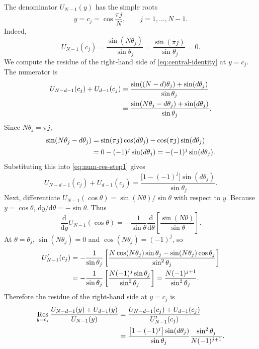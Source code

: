 \documentclass[11pt]{article}
\newcommand{\dd}{\mathrm{d}}
\DeclareMathOperator{\Res}{Res}
\begin{document}
The denominator $U_{N-1}(y)$ has the simple roots
\begin{equation}
  y=c_j=\cos\frac{\pi j}{N},
  \qquad j=1,\ldots,N-1.
\end{equation}
Indeed,
\begin{equation}
  U_{N-1}(c_j)=\frac{\sin(N\theta_j)}{\sin\theta_j}
  =\frac{\sin(\pi j)}{\sin\theta_j}=0.
\end{equation}
We compute the residue of the right-hand side of \eqref{eq:central-identity} at $y=c_j$.
The numerator is
\begin{align}
  U_{N-d-1}(c_j)+U_{d-1}(c_j)
  &=\frac{\sin((N-d)\theta_j)+\sin(d\theta_j)}{\sin\theta_j} \notag\\
  &=\frac{\sin(N\theta_j-d\theta_j)+\sin(d\theta_j)}{\sin\theta_j}.\label{eq:num-res-step1}
\end{align}
Since $N\theta_j=\pi j$,
\begin{align}
  \sin(N\theta_j-d\theta_j)
  &=\sin(\pi j)\cos(d\theta_j)-\cos(\pi j)\sin(d\theta_j)\notag\\
  &=0-(-1)^j\sin(d\theta_j)
  =-(-1)^j\sin(d\theta_j).
\end{align}
Substituting this into \eqref{eq:num-res-step1} gives
\begin{equation}
  U_{N-d-1}(c_j)+U_{d-1}(c_j)
  =\frac{\bigl[1-(-1)^j\bigr]\sin(d\theta_j)}{\sin\theta_j}.
  \label{eq:numerator-at-root}
\end{equation}
Next, differentiate $U_{N-1}(\cos\theta)=\sin(N\theta)/\sin\theta$ with respect to $y$.
Because $y=\cos\theta$, $\dd y/\dd\theta=-\sin\theta$.  Thus
\begin{equation}
  \frac{\dd}{\dd y}U_{N-1}(\cos\theta)
  =-\frac{1}{\sin\theta}\frac{\dd}{\dd\theta}
  \left[\frac{\sin(N\theta)}{\sin\theta}\right].
\end{equation}
At $\theta=\theta_j$, $\sin(N\theta_j)=0$ and $\cos(N\theta_j)=(-1)^j$, so
\begin{align}
  U_{N-1}'(c_j)
  &=-\frac{1}{\sin\theta_j}
  \left[\frac{N\cos(N\theta_j)\sin\theta_j-
  \sin(N\theta_j)\cos\theta_j}{\sin^2\theta_j}\right]\notag\\
  &=-\frac{1}{\sin\theta_j}\left[\frac{N(-1)^j\sin\theta_j}{\sin^2\theta_j}\right]
  =\frac{N(-1)^{j+1}}{\sin^2\theta_j}.
  \label{eq:U-prime-root}
\end{align}
Therefore the residue of the right-hand side at $y=c_j$ is
\begin{align}
  \Res_{y=c_j}\frac{U_{N-d-1}(y)+U_{d-1}(y)}{U_{N-1}(y)}
  &=\frac{U_{N-d-1}(c_j)+U_{d-1}(c_j)}{U_{N-1}'(c_j)}\notag\\
  &=\frac{\bigl[1-(-1)^j\bigr]\sin(d\theta_j)}{\sin\theta_j}
  \frac{\sin^2\theta_j}{N(-1)^{j+1}}.\label{eq:residue-rhs-before}
\end{align}
\end{document}
